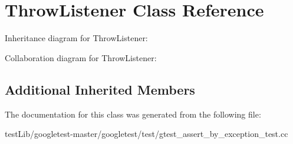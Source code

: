 \hypertarget{classThrowListener}{}\section{Throw\+Listener Class Reference}
\label{classThrowListener}


Inheritance diagram for Throw\+Listener\+:


Collaboration diagram for Throw\+Listener\+:
\subsection*{Additional Inherited Members}


The documentation for this class was generated from the following file\+:\begin{DoxyCompactItemize}
\item 
test\+Lib/googletest-\/master/googletest/test/gtest\+\_\+assert\+\_\+by\+\_\+exception\+\_\+test.\+cc\end{DoxyCompactItemize}
